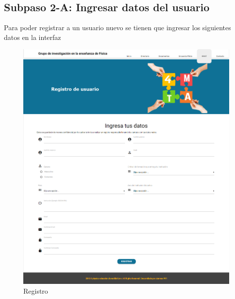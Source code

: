 \subsection{Subpaso 2-A: Ingresar datos del usuario}
Para poder registrar a un usuario nuevo se tienen que ingresar los siguientes datos en la interfaz
\begin{figure}[hbtp]
		
		\includegraphics[scale=0.3]{images/Interfaz/IUGS11_registrarUsusario.png}
		\caption{Registro}
	\end{figure}
